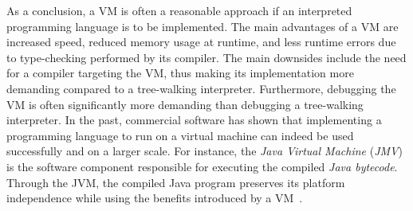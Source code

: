 As a conclusion, a VM is often a reasonable approach if an interpreted programming language is to be implemented.
The main advantages of a VM are increased speed, reduced memory usage at runtime, and less runtime errors due to type-checking performed by its compiler.
The main downsides include the need for a compiler targeting the VM, thus making its implementation more demanding compared to a tree-walking interpreter.
Furthermore, debugging the VM is often significantly more demanding than debugging a tree-walking interpreter.
In the past, commercial software has shown that implementing a programming language to run on a virtual machine can indeed be used successfully and on a larger scale.
For instance, the \emph{Java Virtual Machine} (\emph{JMV}) is the software component responsible for executing the compiled \emph{Java bytecode}.
Through the JVM, the compiled Java program preserves its platform independence while using the benefits introduced by a VM~\cite[Chapter~1.2]{Lindholm2014-jb}. %
